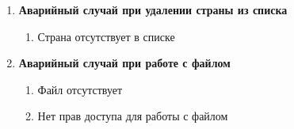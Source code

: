 \begin{enumerate}
	\item\textbf{Аварийный случай при удалении страны из списка}
	\begin{enumerate}
		\item Страна отсутствует в списке
	\end{enumerate}
	
	\item\textbf{Аварийный случай при работе с файлом}
	\begin{enumerate}
		\item Файл отсутствует
		\item Нет прав доступа для работы с файлом
	\end{enumerate}
\end{enumerate}
